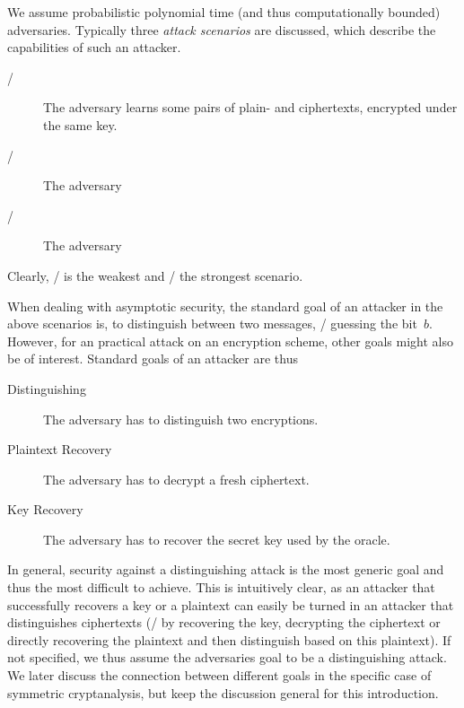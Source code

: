 
We assume probabilistic polynomial time (and thus computationally bounded) adversaries.
Typically three \emph{attack scenarios} are discussed, which describe the capabilities of such an attacker.
\begin{description}
    \item[\KPA/] The adversary learns some pairs of plain- and ciphertexts, encrypted under the same key.
    \item[\CPA/] The adversary 
    \item[\CCA/] The adversary 
\end{description}
Clearly, \KPA/ is the weakest and \CCA/ the strongest scenario.

When dealing with asymptotic security, the standard goal of an attacker in the above scenarios is, to distinguish between two messages, \ie/ guessing the bit~$b$.
However, for an practical attack on an encryption scheme, other goals might also be of interest.
Standard goals of an attacker are thus
\begin{description}
    \item[Distinguishing] The adversary has to distinguish two encryptions.
    \item[Plaintext Recovery] The adversary has to decrypt a fresh ciphertext.
    \item[Key Recovery] The adversary has to recover the secret key used by the oracle.
\end{description}
In general, security against a distinguishing attack is the most generic goal and thus the most difficult to achieve.
This is intuitively clear, as an attacker that successfully recovers a key or a plaintext can easily be turned in an attacker that distinguishes ciphertexts (\ie/ by recovering the key, decrypting the ciphertext or directly recovering the plaintext and then distinguish based on this plaintext).
If not specified, we thus assume the adversaries goal to be a distinguishing attack.
We later discuss the connection between different goals in the specific case of symmetric cryptanalysis, but keep the discussion general for this introduction.


